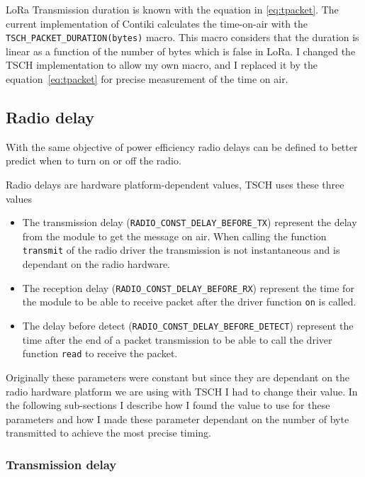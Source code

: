 LoRa Transmission duration is known with the equation in \ref{eq:tpacket}.
The current implementation of Contiki calculates the time-on-air with the
\lstinline{TSCH_PACKET_DURATION(bytes)} macro.
This macro considers that the duration is linear as a function of the
number of bytes which is false in LoRa.
I changed the TSCH implementation to allow my own macro, and
I replaced it by the equation~\ref{eq:tpacket} for precise measurement
of the time on air.

\subsection{Radio delay}

With the same objective of power efficiency radio delays can be defined
to better predict when to turn on or off the radio.

Radio delays are hardware platform-dependent values, TSCH uses these three values

\begin{itemize}
  \item The transmission delay (\lstinline{RADIO_CONST_DELAY_BEFORE_TX})
    represent the delay from the module to get the message on air.
    When calling the function \lstinline{transmit} of the radio driver
    the transmission is not instantaneous and is dependant on the radio
    hardware.
  \item The reception delay (\lstinline{RADIO_CONST_DELAY_BEFORE_RX})
    represent the time for the module to be able to receive packet after the
    driver function \lstinline{on} is called.
  \item The delay before detect (\lstinline{RADIO_CONST_DELAY_BEFORE_DETECT})
    represent the time after the end of a packet transmission to be able to
    call the driver function \lstinline{read} to receive the packet.
\end{itemize}

Originally these parameters were constant but since they are dependant on the
radio hardware platform we are using with TSCH I had to change their value.
In the following sub-sections I describe how I found the value to use for these
parameters and how I made these parameter dependant on the number of byte
transmitted to achieve the most precise timing.

\subsubsection{Transmission delay}

